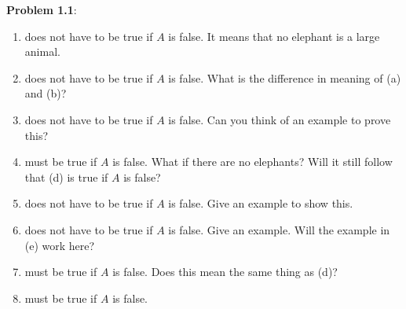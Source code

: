 \documentclass[english]{book}
\begin{document}
\textbf{Problem 1.1}:
\begin{enumerate}[\hspace{1cm}(a)]
  \item does not have to be true if $A$ is false. It means that no elephant is a large animal.
  \item does not have to be true if $A$ is false. What is the difference in meaning of (a) and (b)?
  \item does not have to be true if $A$ is false. Can you think of an example to prove this?
  \item must be true if $A$ is false. What if there are no elephants? Will it still follow that (d) is true if $A$ is false?
  \item does not have to be true if $A$ is false. Give an example to show this.
  \item does not have to be true if $A$ is false. Give an example. Will the example in (e) work here?
  \item must be true if $A$ is false. Does this mean the same thing as (d)?
  \item must be true if $A$ is false.
\end{enumerate}
\end{document}

